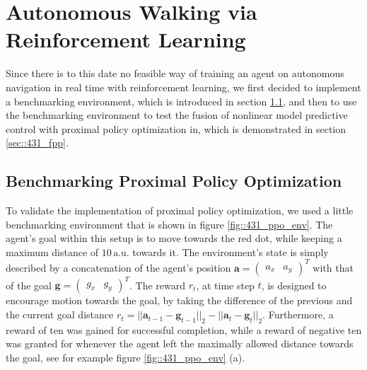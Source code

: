 \FloatBarrier
\section{Autonomous Walking via Reinforcement Learning}
\label{sec::43_ar}
Since there is to this date no feasible way of training an agent on autonomous navigation in real time with reinforcement learning, we first decided to implement a benchmarking environment, which is introduced in section \ref{sec::431_bpp}, and then to use the benchmarking environment to test the fusion of nonlinear model predictive control with proximal policy optimization in, which is demonstrated in section \ref{sec::431_fpp}.
\subsection{Benchmarking Proximal Policy Optimization}
\label{sec::431_bpp}
To validate the implementation of proximal policy optimization, we used a little benchmarking environment that is shown in figure \ref{fig::431_ppo_env}. The agent's goal within this setup is to move towards the red dot, while keeping a maximum distance of $10\,\text{a.u.}$ towards it. The environment's state is simply described by a concatenation of the agent's position $\bm{a} = \begin{pmatrix}
a_x & a_y
\end{pmatrix}^T$ with that of the goal $\bm{g} = \begin{pmatrix}
g_x & g_y
\end{pmatrix}^T$. The reward $r_t$, at time step $t$, is designed to encourage motion towards the goal, by taking the difference of the previous and the current goal distance $r_t = ||\bm{a}_{t-1}-\bm{g}_{t-1}||_2 - ||\bm{a}_{t}-\bm{g}_{t}||_2$. Furthermore, a reward of ten was gained for successful completion, while a reward of negative ten was granted for whenever the agent left the maximally allowed distance towards the goal, see for example figure \ref{fig::431_ppo_env} (a).
